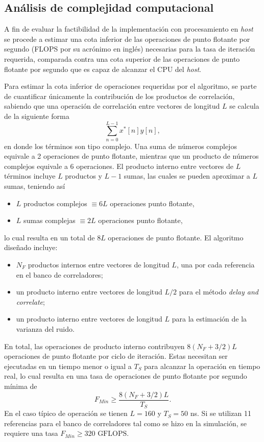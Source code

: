 \color{blue}
\subsection{Análisis de complejidad computacional}

A fin de evaluar la factibilidad de la implementación con procesamiento en \textit{host} se procede a estimar una cota inferior de las operaciones de punto flotante por segundo (FLOPS por su acrónimo en inglés) necesarias para la tasa de iteración requerida, comparada contra una cota superior de las operaciones de punto flotante por segundo que es capaz de alcanzar el CPU del \textit{host}. 

Para estimar la cota inferior de operaciones requeridas por el algoritmo, se parte de cuantificar únicamente la contribución de los productos de correlación, sabiendo que una operación de correlación entre vectores de longitud $L$ se calcula de la siguiente forma
\begin{equation}
    \sum_{n=0}^{L-1}x^\ast[n]y[n],
\end{equation}
en donde los términos son tipo complejo. Una suma de números complejos equivale a 2 operaciones de punto flotante, mientras que un producto de números complejos equivale a 6 operaciones. El producto interno entre vectores de $L$ términos incluye $L$ productos y $L-1$ sumas, las cuales se pueden aproximar a $L$ sumas, teniendo así
\begin{itemize}
    \item $L$ productos complejos $\equiv 6L$ operaciones punto flotante,
    \item $L$ sumas complejas $\equiv 2L$ operaciones punto flotante,
\end{itemize}
lo cual resulta en un total de $8L$ operaciones de punto flotante. El algoritmo diseñado incluye:
\begin{itemize}
    \item $N_F$ productos internos entre vectores de longitud $L$, una por cada referencia en el banco de correladores;
    \item un producto interno entre vectores de longitud $L/2$ para el método \textit{delay and correlate};
    \item un producto interno entre vectores de longitud $L$ para la estimación de la varianza del ruido.
\end{itemize}
En total, las operaciones de producto interno contribuyen $8(N_F+3/2)L$ operaciones de punto flotante por ciclo de iteración. Estas necesitan ser ejecutadas en un tiempo menor o igual a $T_S$ para alcanzar la operación en tiempo real, lo cual resulta en una tasa de operaciones de punto flotante por segundo mínima de
\begin{equation}
    F_{Min} \ge \frac{8(N_F+3/2)L}{T_S}.
\end{equation}
En el caso típico de operación se tienen $L=160$ y $T_S=50$ ns. Si se utilizan 11 referencias para el banco de correladores tal como se hizo en la simulación, se requiere una tasa $F_{Min}\ge 320\text{ GFLOPS}$. 

